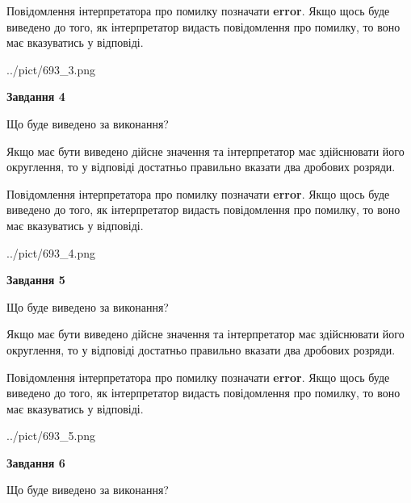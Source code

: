 \documentclass[12pt, ukrainian]{article}
\begin{document}
{\begin {Large}
Повідомлення інтерпретатора про помилку позначати \textbf{error}.
Якщо щось буде виведено до того, як інтерпретатор видасть повідомлення про помилку, 
то воно має вказуватись у відповіді. \par

\begin{center}
	{../pict/693_3.png}
\end{center}
\newpage

{\begin {center}\textbf{Завдання 4}\end {center}}\par
Що буде виведено за виконання? \par

Якщо має бути виведено дійсне значення та інтерпретатор має здійснювати його округлення, 
то у відповіді достатньо правильно вказати два дробових розряди.

Повідомлення інтерпретатора про помилку позначати \textbf{error}.
Якщо щось буде виведено до того, як інтерпретатор видасть повідомлення про помилку, 
то воно має вказуватись у відповіді. \par

\begin{center}
	{../pict/693_4.png}
\end{center}
\newpage

{\begin {center}\textbf{Завдання 5}\end {center}}\par
Що буде виведено за виконання? \par

Якщо має бути виведено дійсне значення та інтерпретатор має здійснювати його округлення, 
то у відповіді достатньо правильно вказати два дробових розряди.

Повідомлення інтерпретатора про помилку позначати \textbf{error}.
Якщо щось буде виведено до того, як інтерпретатор видасть повідомлення про помилку, 
то воно має вказуватись у відповіді. \par

\begin{center}
	{../pict/693_5.png}
\end{center}
\newpage

{\begin {center}\textbf{Завдання 6}\end {center}}\par
Що буде виведено за виконання? \par


\end{Large}}
\end{document}
